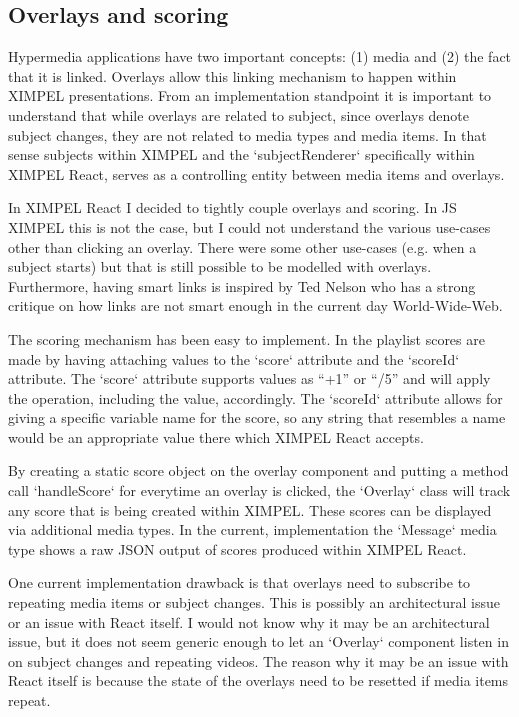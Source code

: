 \subsection{Overlays and scoring}
Hypermedia applications have two important concepts: (1) media and (2) the fact that it is linked. Overlays allow this linking mechanism to happen within XIMPEL presentations. From an implementation standpoint it is important to understand that while overlays are related to subject, since overlays denote subject changes, they are not related to media types and media items. In that sense subjects within XIMPEL and the `subjectRenderer` specifically within XIMPEL React, serves as a controlling entity between media items and overlays.

In XIMPEL React I decided to tightly couple overlays and scoring. In JS XIMPEL this is not the case, but I could not understand the various use-cases other than clicking an overlay. There were some other use-cases (e.g. when a subject starts) but that is still possible to be modelled with overlays. Furthermore, having smart links is inspired by Ted Nelson who has a strong critique on how links are not smart enough in the current day World-Wide-Web.

The scoring mechanism has been easy to implement. In the playlist scores are made by having attaching values to the `score` attribute and the `scoreId` attribute. The `score` attribute supports values as ``+1'' or ``/5'' and will apply the operation, including the value, accordingly. The `scoreId` attribute allows for giving a specific variable name for the score, so any string that resembles a name would be an appropriate value there which XIMPEL React accepts. 

By creating a static score object on the overlay component and putting a method call `handleScore` for everytime an overlay is clicked, the `Overlay` class will track any score that is being created within XIMPEL. These scores can be displayed via additional media types. In the current, implementation the `Message` media type shows a raw JSON output of scores produced within XIMPEL React.

One current implementation drawback is that overlays need to subscribe to repeating media items or subject changes. This is possibly an architectural issue or an issue with React itself. I would not know why it may be an architectural issue, but it does not seem generic enough to let an `Overlay` component listen in on subject changes and repeating videos. The reason why it may be an issue with React itself is because the state of the overlays need to be resetted if media items repeat.

